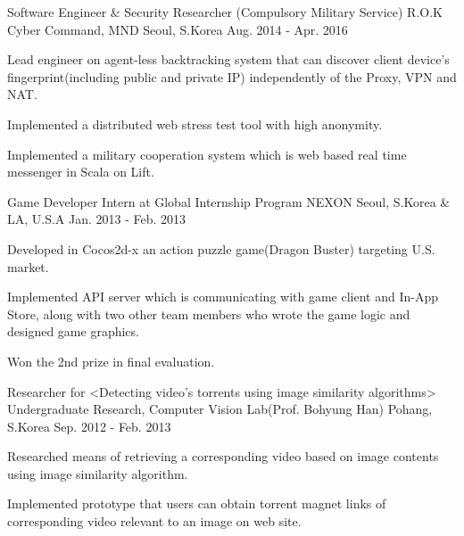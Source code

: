 \begin{cventries}
  \cventry
    {Software Engineer \& Security Researcher (Compulsory Military Service)} %
    {R.O.K Cyber Command, MND} %
    {Seoul, S.Korea} %
    {Aug. 2014 - Apr. 2016} %
    {
      \begin{cvitems} %
        \item {Lead engineer on agent-less backtracking system that can discover client device's fingerprint(including public and private IP) independently of the Proxy, VPN and NAT.}
        \item {Implemented a distributed web stress test tool with high anonymity.}
        \item {Implemented a military cooperation system which is web based real time messenger in Scala on Lift.}
      \end{cvitems}
    }

  \cventry
    {Game Developer Intern at Global Internship Program} %
    {NEXON} %
    {Seoul, S.Korea \& LA, U.S.A} %
    {Jan. 2013 - Feb. 2013} %
    {
      \begin{cvitems} %
        \item {Developed in Cocos2d-x an action puzzle game(Dragon Buster) targeting U.S. market.}
        \item {Implemented API server which is communicating with game client and In-App Store, along with two other team members who wrote the game logic and designed game graphics.}
        \item {Won the 2nd prize in final evaluation.}
      \end{cvitems}
    }

  \cventry
    {Researcher for <Detecting video’s torrents using image similarity algorithms>} %
    {Undergraduate Research, Computer Vision Lab(Prof. Bohyung Han)} %
    {Pohang, S.Korea} %
    {Sep. 2012 - Feb. 2013} %
    {
      \begin{cvitems} %
        \item {Researched means of retrieving a corresponding video based on image contents using image similarity algorithm.}
        \item {Implemented prototype that users can obtain torrent magnet links of corresponding video relevant to an image on web site.}
      \end{cvitems}
    }


\end{cventries}
